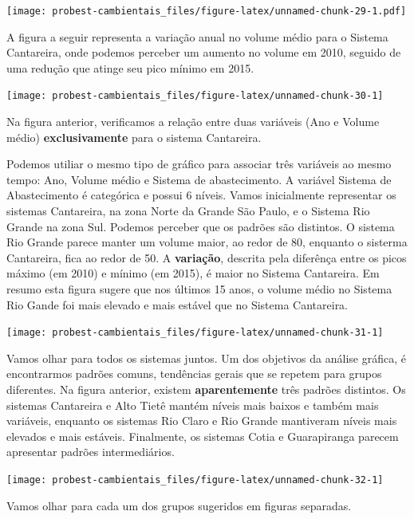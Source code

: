 \documentclass[
]{book}
\begin{document}
\texttt{[image: probest-cambientais\_files/figure-latex/unnamed-chunk-29-1.pdf]}

A figura a seguir representa a variação anual no volume médio para o Sistema Cantareira, onde podemos perceber um aumento no volume em 2010, seguido de uma redução que atinge seu pico mínimo em 2015.

\begin{center}\texttt{[image: probest-cambientais\_files/figure-latex/unnamed-chunk-30-1]} \end{center}

Na figura anterior, verificamos a relação entre duas variáveis (Ano e Volume médio) \textbf{exclusivamente} para o sistema Cantareira.

Podemos utiliar o mesmo tipo de gráfico para associar três variáveis ao mesmo tempo: Ano, Volume médio e Sistema de abastecimento. A variável Sistema de Abastecimento é categórica e possui 6 níveis. Vamos inicialmente representar os sistemas Cantareira, na zona Norte da Grande São Paulo, e o Sistema Rio Grande na zona Sul. Podemos perceber que os padrões são distintos. O sistema Rio Grande parece manter um volume maior, ao redor de 80, enquanto o sisterma Cantareira, fica ao redor de 50. A \textbf{variação}, descrita pela diferênça entre os picos máximo (em 2010) e mínimo (em 2015), é maior no Sistema Cantareira. Em resumo esta figura sugere que nos últimos 15 anos, o volume médio no Sistema Rio Gande foi mais elevado e mais estável que no Sistema Cantareira.

\begin{center}\texttt{[image: probest-cambientais\_files/figure-latex/unnamed-chunk-31-1]} \end{center}

Vamos olhar para todos os sistemas juntos. Um dos objetivos da análise gráfica, é encontrarmos padrões comuns, tendências gerais que se repetem para grupos diferentes. Na figura anterior, existem \textbf{aparentemente} três padrões distintos. Os sistemas Cantareira e Alto Tietê mantém níveis mais baixos e também mais variáveis, enquanto os sistemas Rio Claro e Rio Grande mantiveram níveis mais elevados e mais estáveis. Finalmente, os sistemas Cotia e Guarapiranga parecem apresentar padrões intermediários.

\begin{center}\texttt{[image: probest-cambientais\_files/figure-latex/unnamed-chunk-32-1]} \end{center}

Vamos olhar para cada um dos grupos sugeridos em figuras separadas.
\end{document}
